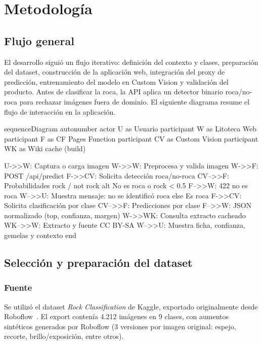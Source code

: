 \section{Metodología}
\label{sec:methodology}

\subsection{Flujo general}

El desarrollo siguió un flujo iterativo: definición del contexto y clases,
preparación del dataset, construcción de la aplicación web, integración del proxy
de predicción, entrenamiento del modelo en Custom Vision y validación del producto.
Antes de clasificar la roca, la API aplica un detector binario roca/no-roca para
rechazar imágenes fuera de dominio. El siguiente diagrama resume el flujo de interacción en la aplicación.

\begin{mermaid}[style=editorial, width=0.95\linewidth, pos=H, caption={Flujo general de predicción en Litoteca}]
  sequenceDiagram
    autonumber
    actor U as Usuario
    participant W as Litoteca Web
    participant F as CF Pages Function
    participant CV as Custom Vision
    participant WK as Wiki cache (build)

    U->>W: Captura o carga imagen
    W->>W: Preprocesa y valida imagen
    W->>F: POST /api/predict
    F->>CV: Solicita detección roca/no-roca
    CV-->>F: Probabilidades rock / not rock
    alt No es roca o rock < 0.5
      F-->>W: 422 no es roca
      W-->>U: Muestra mensaje: no se identificó roca
    else Es roca
      F->>CV: Solicita clasificación por clase
      CV-->>F: Predicciones por clase
      F-->>W: JSON normalizado (top, confianza, margen)
      W->>WK: Consulta extracto cacheado
      WK-->>W: Extracto y fuente CC BY-SA
      W-->>U: Muestra ficha, confianza, gemelas y contexto
    end
\end{mermaid}

\subsection{Selección y preparación del dataset}

\subsubsection{Fuente}

Se utilizó el dataset \emph{Rock Classification} de Kaggle, exportado originalmente
desde Roboflow~\cite{rockdataset}. El export contenía 4.212 imágenes en 9 clases,
con aumentos sintéticos generados por Roboflow (3 versiones por imagen original:
espejo, recorte, brillo/exposición, entre otros).

